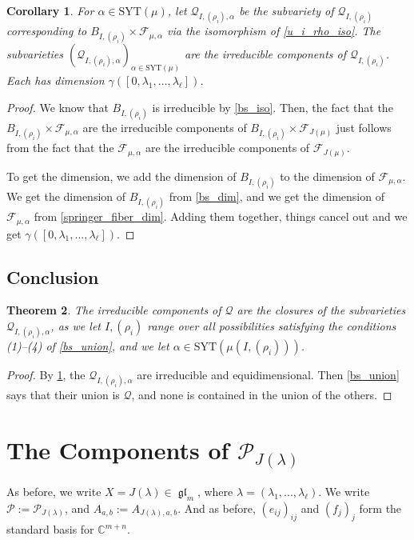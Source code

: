 \documentclass[12pt,psamsfonts]{article}
\DeclareMathOperator{\gl}{\mathfrak{gl}}
\newtheorem{theorem}{Theorem}[section]
\newtheorem{corollary}[theorem]{Corollary}
\begin{document}
\begin{corollary}\label{u_i_rho_irred_and_dim}
    For \(\alpha \in \mathrm{SYT}(\mu)\), let \(\mathcal{Q}_{I, (\rho_i), \alpha}\) be the subvariety of \(\mathcal{Q}_{I, (\rho_i)}\) corresponding to \(B_{I, (\rho_i)} \times \mathcal{F}_{\mu, \alpha}\) via the isomorphism of \cref{u_i_rho_iso}.
    The subvarieties \((\mathcal{Q}_{I, (\rho_i), \alpha})_{\alpha \in \mathrm{SYT}(\mu)}\) are the irreducible components of \(\mathcal{Q}_{I, (\rho_i)}\).
    Each has dimension \(\gamma([0, \lambda_1, ..., \lambda_\ell])\).
\end{corollary}
\begin{proof}
    We know that \(B_{I, (\rho_i)}\) is irreducible by \cref{bs_iso}.
    Then, the fact that the \(B_{I, (\rho_i)} \times \mathcal{F}_{\mu, \alpha}\) are the irreducible components of \(B_{I, (\rho_i)} \times \mathcal{F}_{J(\mu)}\) just follows from the fact that the \(\mathcal{F}_{\mu, \alpha}\) are the irreducible components of \(\mathcal{F}_{J(\mu)}\).
    \par To get the dimension, we add the dimension of \(B_{I, (\rho_i)}\) to the dimension of \(\mathcal{F}_{\mu, \alpha}\).
    We get the dimension of \(B_{I, (\rho_i)}\) from \cref{bs_dim}, and we get the dimension of \(\mathcal{F}_{\mu, \alpha}\) from \cref{springer_fiber_dim}.
    Adding them together, things cancel out and we get \(\gamma([0, \lambda_1, ..., \lambda_\ell])\).
\end{proof}

\subsection{Conclusion}
\begin{theorem}\label{Q_comps}
    The irreducible components of \(\mathcal{Q}\) are the closures of the subvarieties \(\mathcal{Q}_{I, (\rho_i), \alpha}\), as we let \(I, (\rho_i)\) range over all possibilities satisfying the conditions (1)--(4) of \cref{bs_union}, and we let \(\alpha \in \mathrm{SYT}(\mu(I, (\rho_i)))\).
\end{theorem}
\begin{proof}
    By \cref{u_i_rho_irred_and_dim}, the \(\mathcal{Q}_{I, (\rho_i), \alpha}\) are irreducible and equidimensional.
    Then \cref{bs_union} says that their union is \(\mathcal{Q}\), and none is contained in the union of the others.
\end{proof}

\section{The Components of \texorpdfstring{\(\mathcal{P}_{J(\lambda)}\)}{P\_\{J(\textbackslash lambda)\}}}\label{p_comp}
As before, we write \(X = J(\lambda) \in \gl_m\), where \(\lambda = (\lambda_1, ..., \lambda_\ell)\).
We write \(\mathcal{P} := \mathcal{P}_{J(\lambda)}\), and \(A_{a,b} := A_{J(\lambda), a, b}\).
And as before, \((e_{ij})_{ij}\) and \((f_j)_j\) form the standard basis for \(\mathbb{C}^{m + n}\).
\end{document}
